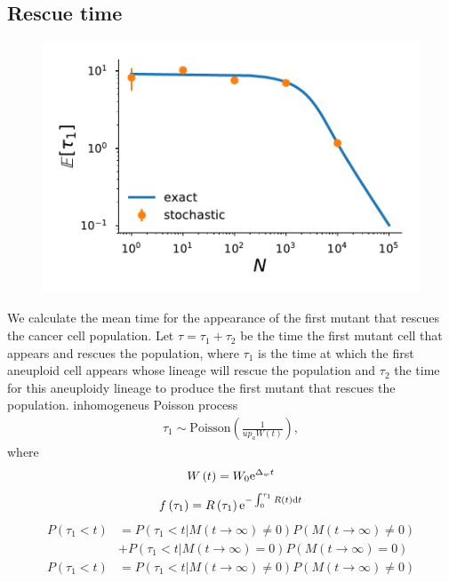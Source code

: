 \documentclass[12pt]{extarticle}
\renewcommand{\d}{{\rm d}}
\newcommand{\e}{{\rm e}}
\begin{document}
\subsection*{Rescue time}
\begin{figure}[!t]
 \vspace*{1\baselineskip}
\includegraphics[width=1\textwidth]{Figures/MeanTimeGrowthAneuploidyPlot.pdf}
\caption{}
\label{MeanTimeGrowthAneuploidyPlot}
\end{figure}
We calculate the mean time for the appearance of the first mutant that rescues the cancer cell population.
Let $\tau=\tau_1+\tau_2$ be the time the first mutant cell that appears and rescues the population, where $\tau_1$ is the time at which the first aneuploid cell appears whose lineage will rescue the population and $\tau_2$ the time for this aneuploidy lineage to produce the first mutant that rescues the population. 
inhomogeneus Poisson process
\begin{align}
\tau_1\sim \text{Poisson}\left(\frac{1}{up_aW\left(t\right)}\right),
\end{align}
where 
\begin{equation}
W\left(t\right)=W_0\e^{\Delta_wt}
\end{equation}
\begin{align}
f\left(\tau_1\right)=R\left(\tau_1\right)\e^{-\int_0^{\tau_1} R(t)\d t}
\end{align}
\begin{align*}
P\left(\tau_1<t\right)&=P\left(\tau_1<t|M\left(t\rightarrow\infty\right)\neq0\right)P\left(M\left(t\rightarrow\infty\right)\neq0\right)\\
&+P\left(\tau_1<t|M\left(t\rightarrow\infty\right)=0\right)P\left(M\left(t\rightarrow\infty\right)=0\right)\\
P\left(\tau_1<t\right)&=P\left(\tau_1<t|M\left(t\rightarrow\infty\right)\neq0\right)P\left(M\left(t\rightarrow\infty\right)\neq0\right)
\end{align*}
\end{document}
